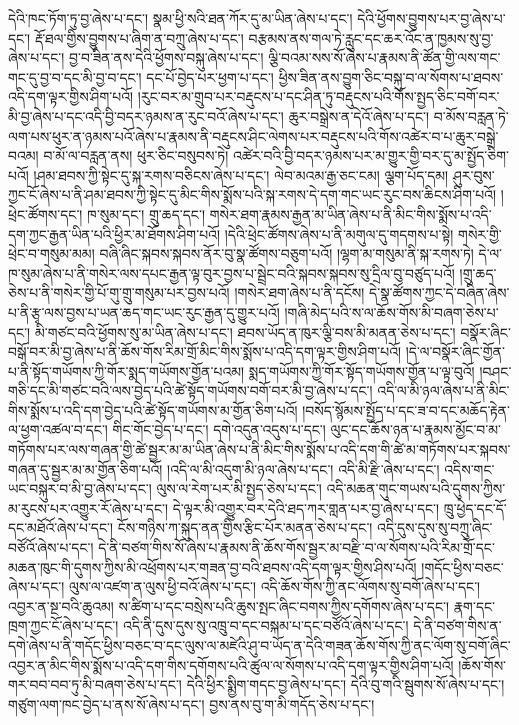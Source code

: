 དེའི་ཁང་ཏོག་ཏུ་བྱ་ཞེས་པ་དང་། སྣམ་ཕྱི་སའི་ཐན་ཀོར་དུ་མ་ཡིན་ཞེས་པ་དང་། དེའི་ཕྱོགས་བྱུགས་པར་བྱ་ཞེས་པ་དང་། རྡོ་ཐལ་གྱིས་བྱུགས་པ་ཞིག་ན་བཀྲུ་ཞེས་པ་དང་། བརྩམས་ནས་གལ་ཏེ་རླུང་དང་ཆར་འོང་ན་ཁྱམས་སུ་བྱ་ཞེས་པ་དང་། བྱ་བ་ཟིན་ནས་དེའི་ཕྱོགས་བསྐུ་ཞེས་པ་དང་། ལྕི་བའམ་སས་སོ་ཞེས་པ་རྣམས་ནི་ཚོན་གྱི་ལས་གང་གང་དུ་བྱ་བ་དང་མི་བྱ་བ་དང་། དང་པོ་བྱེད་པར་ཕྱག་པ་དང་། ཕྱིས་ཟིན་ནས་བྱུག་ཅིང་བསྐུ་བ་ལ་སོགས་པ་ཐབས་འདི་དག་ལྟར་གྱིས་ཤིག་པའོ། །རུང་བར་མ་གྲུབ་པར་བརྡུངས་པ་དང་ཤིན་ཏུ་བརྡུངས་པའི་གོས་སྤྱད་ཅིང་བགོ་བར་མི་བྱ་ཞེས་པ་དང་འདི་བྱི་བདར་ཉམས་ན་རུང་བའོ་ཞེས་པ་དང་། ཆུར་བསྒྲེས་ན་དེའོ་ཞེས་པ་དང་། བ་མོས་བརླན་ཏེ་ལག་པས་ཕུར་ན་ཉམས་པའོ་ཞེས་པ་རྣམས་ནི་བརྡུངས་ཤིང་ལེགས་པར་བརྡུངས་པའི་གོས་འཚེར་བ་པ་ཆུར་བསྒྲེ་བའམ། བ་མོ་ལ་བརླན་ནས། ཕུར་ཅིང་བསུབས་ཏེ། འཚེར་བའི་བྱི་བདར་ཉམས་པར་མ་གྱུར་གྱི་བར་དུ་མ་སྤྱོད་ཅིག་པའོ། །ཤམ་ཐབས་ཀྱི་སྟེང་དུ་སྐ་རགས་བཅིངས་ཞེས་པ་དང་། ལེབ་མའམ་རྒྱ་ཅང་ངམ། ལྕག་པོད་དམ། ཤུར་བུས་ཀྱང་ངོ་ཞེས་པ་ནི་ཤམ་ཐབས་ཀྱི་སྟེང་དུ་མིང་གིས་སྨོས་པའི་སྐ་རགས་དེ་དག་གང་ཡང་རུང་བས་ཆིངས་ཤིག་པའོ། །ཕྲེང་ཚོགས་དང་། ཁ་སུམ་དང་། གྲུ་ཆད་དང་། གསེར་ཐག་རྣམས་རྒྱན་མ་ཡིན་ཞེས་པ་ནི་མིང་གིས་སྨོས་པ་འདི་དག་ཀྱང་རྒྱན་ཡིན་པའི་ཕྱིར་མ་ཐོགས་ཤིག་པའོ། །དེའི་ཕྲེང་ཚོགས་ཞེས་པ་ནི་མགུལ་དུ་གདགས་པ་སྟེ། གསེར་གྱི་ཕྲེང་བ་གསུམ་མམ། བཞི་ཞིང་སྐབས་སྐབས་ནོར་བུ་སྣ་ཚོགས་བཅུག་པའོ། །ལྷག་མ་གསུམ་ནི་སྐ་རགས་ཏེ། དེ་ལ་ཁ་སུམ་ཞེས་པ་ནི་གསེར་ལས་དཔང་རྒྱན་ལྟ་བུར་བྱས་པ་སྦྲེང་བའི་སྐབས་སྐབས་སུ་དྲིལ་བུ་བཙུད་པའོ། །གྲུ་ཆད་ཅེས་པ་ནི་གསེར་གྱི་པོ་གུ་གྲུ་གསུམ་པར་བྱས་པའོ། །གསེར་ཐག་ཞེས་པ་ནི་དངོས། དེ་སྣ་ཚོགས་ཀྱང་དེ་བཞིན་ཞེས་པ་ནི་རྩྭ་ལས་བྱས་པ་ཡན་ཆད་གང་ཡང་རུང་རྒྱན་དུ་གྱུར་པའོ། །གཞི་མེད་པའི་ས་ལ་ཆོས་གོས་མི་བཞག་ཅེས་པ་དང་། མི་གཙང་བའི་ཕྱོགས་སུ་མ་ཡིན་ཞེས་པ་དང་། ཐབས་ཡོད་ན་ཁུར་ལྕི་བས་མི་མནན་ཅེས་པ་དང་། བསྣོར་ཞིང་བསྒོ་བར་མི་བྱ་ཞེས་པ་ནི་ཆོས་གོས་རིམ་གྲོ་མིང་གིས་སྨོས་པ་འདི་དག་ལྟར་གྱིས་ཤིག་པའོ། །དེ་ལ་བསྣོར་ཞིང་གྱོན་པ་ནི་སྟོད་གཡོགས་ཀྱི་གོར་སྨད་གཡོགས་གྱོན་པའམ། སྨད་གཡོགས་ཀྱི་གོར་སྟོད་གཡོགས་གྱོན་པ་ལྟ་བུའོ། །བཤང་གཅི་དང་མི་གཙང་བའི་ལས་བྱེད་པའི་ཚེ་སྟོད་གཡོགས་བགོ་བར་མི་བྱ་ཞེས་པ་དང་། འདི་ལ་མི་ཉལ་ཞེས་པ་ནི་མིང་གིས་སྨོས་པ་འདི་དག་བྱེད་པའི་ཚེ་སྟོད་གཡོགས་མ་གྱོན་ཅིག་པའོ། །བསོད་སྙོམས་སྤྱོད་པ་དང་ཟ་བ་དང་མཆོད་རྟེན་ལ་ཕྱག་འཚལ་བ་དང་། གིང་གོང་བྱེད་པ་དང་། དགེ་འདུན་འདུས་པ་དང་། ལུང་དང་ཆོས་ཉན་པ་རྣམས་མྱོང་བ་མ་གཏོགས་པར་ལས་གཞན་གྱི་ཚེ་སྦྱར་མ་མ་ཡིན་ཞེས་པ་ནི་མིང་གིས་སྨོས་པ་འདི་དག་གི་ཚེ་མ་གཏོགས་པར་སྐབས་གཞན་དུ་སྦྱར་མ་མ་གྱོན་ཅིག་པའོ། །འདི་ལ་མི་འདུག་མི་ཉལ་ཞེས་པ་དང་། འདི་མི་རྫི་ཞེས་པ་དང་། འདིས་གང་ཡང་བསྐུར་བ་མི་བྱ་ཞེས་པ་དང་། ལུས་ལ་རེག་པར་མི་སྤྱད་ཅེས་པ་དང་། འདི་མཆན་གུང་གཡས་པའི་དུགས་ཀྱིས་མ་རུངས་པར་འགྱུར་རོ་ཞེས་པ་དང་། དེ་ལྟར་མི་འགྱུར་བར་དེའི་ཐད་ཀར་གླན་པར་བྱ་ཞེས་པ་དང་། ཁྲུ་ཕྱེད་དང་དོ་དང་མཐོའོ་ཞེས་པ་དང་། ངོས་གཉིས་ཀ་སྐུད་ནན་གྱིས་རྩིང་པོར་མནན་ཅེས་པ་དང་། འདི་དུས་དུས་སུ་བཀྲུ་ཞིང་བཙོའོ་ཞེས་པ་དང་། དེ་ནི་བཙག་གིས་སོ་ཞེས་པ་རྣམས་ནི་ཆོས་གོས་སྦྱར་མ་བརྫི་བ་ལ་སོགས་པའི་རིམ་གྲོ་དང་མཆན་ཁུང་གི་དུགས་ཀྱིས་མི་འཕྲོགས་པར་གཟན་བྱ་བའི་ཐབས་འདི་དག་ལྟར་གྱིས་ཤིས་པའོ། །གདོང་ཕྱིས་བཅང་ཞེས་པ་དང་། ལུས་ལ་འཛག་ན་ལུས་ཕྱི་བའོ་ཞེས་པ་དང་། འདི་ཆོས་གོས་ཀྱི་ནང་ལོགས་སུ་བགོ་ཞེས་པ་དང་། འབྱར་ན་སྔ་བའི་ཆུའམ། ས་ཚིག་པ་དང་བསྲེས་པའི་ཆུས་སྤང་ཞིང་བགས་ཀྱིས་དགོགས་ཞེས་པ་དང་། རྣག་དང་ཁྲག་ཀྱང་ངོ་ཞེས་པ་དང་། འདི་ནི་དུས་དུས་སུ་འཁྲུ་བ་དང་བསྐམ་པ་དང་བཙོའོ་ཞེས་པ་དང་། དེ་ནི་བཙག་གིས་ན་དགེ་ཞེས་པ་ནི་གདོང་ཕྱིས་བཅང་བ་དང་ལུས་ལ་མཛེའི་ཤུ་བ་ཡོད་ན་དེའི་གཟན་ཆོས་གོས་ཀྱི་ནང་ལོག་སུ་བགོ་ཞིང་འབྱར་ན་མིང་གིས་སྨོས་པ་འདི་དག་གིས་དགོགས་པའི་ཚུལ་ལ་སོགས་པ་འདི་དག་ལྟར་གྱིས་ཤིག་པའོ། །ཆོས་གོས་གར་བབ་བབ་ཏུ་མི་བཞག་ཅེས་པ་དང་། དེའི་ཕྱིར་སྨྱིག་གདང་བྱ་ཞེས་པ་དང་། དེའི་བུ་གའི་སྦུགས་སོ་ཞེས་པ་དང་། གཙུག་ལག་ཁང་བྱེད་པ་ནས་སོ་ཞེས་པ་དང་། བྱས་ནས་བུ་ག་མི་གདོད་ཅེས་པ་དང་། 